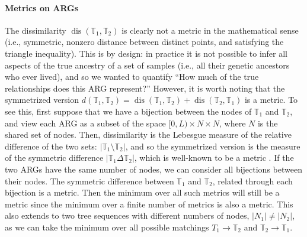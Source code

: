 \documentclass[10pt,twoside,lineno]{gsajnl}
\newcommand{\T}{\mathbb{T}}
\newcommand{\dis}{\operatorname{dis}}
\begin{document}
\paragraph{Metrics on ARGs}
The dissimilarity $\dis(\T_1,\T_2)$ is clearly not a metric in the mathematical sense
(i.e., symmetric, nonzero distance between distinct points, and satisfying the triangle inequality).
This is by design: in practice it is not possible to infer all aspects
of the true ancestry of a set of samples (i.e., all their genetic ancestors who ever lived),
and so we wanted to quantify
``How much of the true relationships does this ARG represent?''
However, it is worth noting that the symmetrized version
$d(\T_1,\T_2) = \dis(\T_1,\T_2) + \dis(\T_2, \T_1)$ is a metric.
To see this, first suppose that we have a bijection between the nodes of $\T_1$ and $\T_2$,
and view each ARG as a subset of the space $[0,L) \times N \times N$,
where $N$ is the shared set of nodes.
Then, dissimilarity is the Lebesgue measure of the relative difference of the two sets:
$|\T_1 \setminus \T_2|$,
and so the symmetrized version is the measure of the symmetric difference
$|\T_1\Delta\T_2|$,
which is well-known to be a metric \citep{rudin1976principles}. 
If the two ARGs have the same number of nodes,
we can consider all bijections between their nodes.
The symmetric difference between $\T_1$ and $\T_2$,
related through each bijection is a metric.
Then the minimum over all such metrics will still be a metric
since the minimum over a finite number of metrics is also a metric.
This also extends to two tree sequences with different numbers of nodes,
$|N_1|\neq|N_2|$, as we can take the minimum over all possible matchings $T_1\to\T_2$ and $\T_2\to\T_1$.
\end{document}
